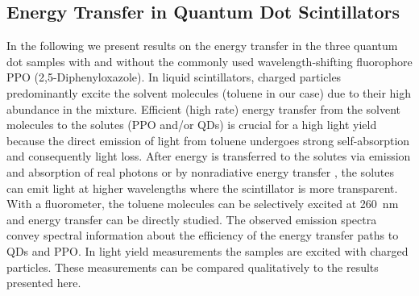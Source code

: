 \documentclass[cits]{JINST}
\begin{document}

\subsection{Energy Transfer in Quantum Dot Scintillators}
In the following we present results on the energy transfer in the three quantum dot samples with and without the commonly used wavelength-shifting fluorophore PPO (2,5-Diphenyloxazole). In liquid scintillators, charged particles predominantly excite the solvent molecules (toluene in our case) due to their high abundance in the mixture. Efficient (high rate) energy transfer from the solvent molecules to the solutes (PPO and/or QDs) is crucial for a high light yield because the direct emission of light from toluene undergoes strong self-absorption and consequently light loss. After energy is transferred to the solutes via emission and absorption of real photons or by nonradiative energy transfer \cite{foerster}, the solutes can emit light at higher wavelengths where the scintillator is more transparent. With a fluorometer, the toluene molecules can be selectively excited at 260~nm and energy transfer can be directly studied. The observed emission spectra convey spectral information about the efficiency of the energy transfer paths to QDs and PPO. In light yield measurements \cite{mitpaper} the samples are excited with charged particles. These measurements can be compared qualitatively to the results presented here.
\end{document}
